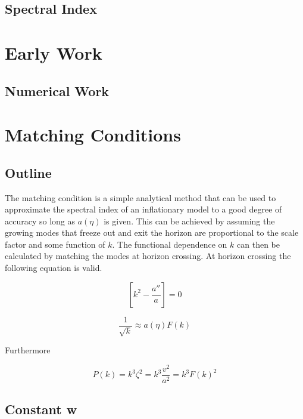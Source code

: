 \documentclass[12pt]{article} %
\begin{document}
\subsection{Spectral Index}

\section{Early Work}

\subsection{Numerical Work}

\section{Matching Conditions}

\subsection{Outline}

The matching condition is a simple analytical method that can be used to approximate the spectral index of an inflationary model to a good degree of accuracy so long as $a(\eta)$ is given. This can be achieved by assuming the growing modes that freeze out and exit the horizon are proportional to the scale factor and some function of $k$. The functional dependence on $k$ can then be calculated by matching the modes at horizon crossing. At horizon crossing the following equation is valid.

\begin{equation}\label{matchingcondition}
\left[ k^{2} - \frac{a''}{a} \right] = 0
\end{equation}

\begin{equation}\label{matchingequation}
\frac{1}{\sqrt{k}} \approx a(\eta)F(k)
\end{equation}

Furthermore

\begin{equation}\label{powerfrommatchingcondition}
P(k)= k^{3}\zeta^{2} = k^{3}\frac{v^{2}}{a^{2}} = k^{3}F(k)^{2}
\end{equation}

\subsection{Constant w}
\end{document}
